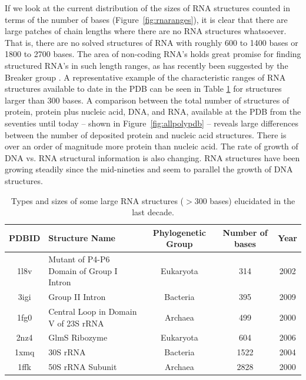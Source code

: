 If we look at the current  distribution of the sizes of RNA structures
counted in terms of  the number of bases (Figure~\ref{fig:rnaranges}),
it is clear that there are  large patches of chain lengths where there
are  no RNA  structures  whatsoever.   That is,  there  are no  solved
structures  of RNA  with roughly  600 to  1400 bases  or 1800  to 2700
bases.  The area  of non-coding RNA's holds great  promise for finding
structured RNA's in such length ranges, as has recently been suggested
by the Breaker group \cite{weinberg2009}.  A representative example of
the characteristic ranges  of RNA structures available to  date in the
PDB can be seen in Table \ref{tab:rnarange} for structures larger than
300  bases. A  comparison between  the total  number of  structures of
protein, protein plus nucleic acid, DNA, and RNA, available at the PDB
from the seventies until today -- shown in Figure~\ref{fig:allpolypdb}
-- reveals large  differences between the number  of deposited protein
and nucleic acid structures.  There is over an order of magnitude more
protein  than  nucleic acid.   The  rate of  growth  of  DNA vs.   RNA
structural  information is  also changing.   RNA structures  have been
growing  steadily since  the  mid-nineties and  seem  to parallel  the
growth of DNA structures.

\begin{table}[ht]
\begin{center}
{\small
\begin{tabular}{c|p{5cm}|c|c|c}
\hline
\bf{PDBID} & \bf{Structure Name} & \bf{Phylogenetic Group} & \bf{Number of bases} & \bf{Year} \\ \hline
1l8v & Mutant of P4-P6 Domain of Group I Intron & Eukaryota & 314 & 2002 \\ \hline
3igi & Group II Intron & Bacteria & 395 & 2009 \\ \hline
1fg0 & Central Loop in Domain V of 23S rRNA & Archaea & 499 & 2000 \\ \hline
2nz4 & GlmS Ribozyme & Eukaryota & 604 & 2006 \\ \hline
1xmq & 30S rRNA & Bacteria & 1522 & 2004 \\ \hline
1ffk & 50S rRNA Subunit & Archaea & 2828 & 2000 \\ \hline
\end{tabular}
}
\caption{Types and  sizes of some large RNA  structures ($>$300 bases)
  elucidated in the last decade.}
\end{center}
\label{tab:rnarange}
\end{table}

